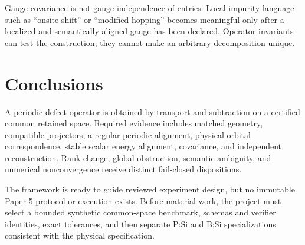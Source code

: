 \documentclass[11pt]{article}
\begin{document}
Gauge covariance is not gauge independence of entries. Local impurity language such as
``onsite shift'' or ``modified hopping'' becomes meaningful only after a localized and
semantically aligned gauge has been declared. Operator invariants can test the
construction; they cannot make an arbitrary decomposition unique.

\section{Conclusions}
A periodic defect operator is obtained by transport and subtraction on a certified
common retained space. Required evidence includes matched geometry, compatible
projectors, a regular periodic alignment, physical orbital correspondence, stable scalar
energy alignment, covariance, and independent reconstruction. Rank change, global
obstruction, semantic ambiguity, and numerical nonconvergence receive distinct
fail-closed dispositions.

The framework is ready to guide reviewed experiment design, but no immutable Paper 5
protocol or execution exists. Before material work, the project must select a bounded
synthetic common-space benchmark, schemas and verifier identities, exact tolerances, and
then separate P:Si and B:Si specializations consistent with the physical specification.

\appendix
\end{document}
